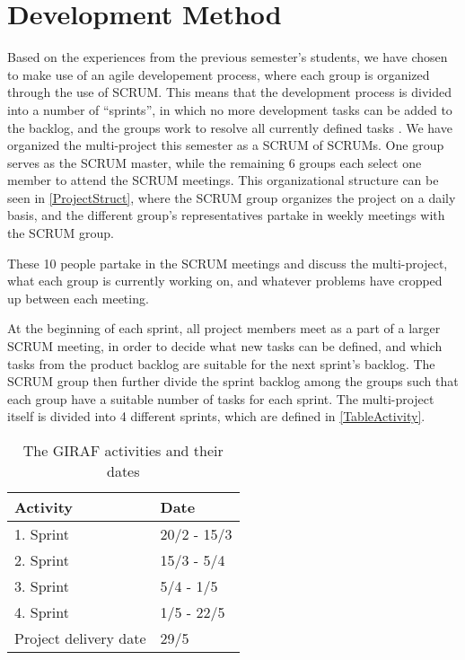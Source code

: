 \section{Development Method}
Based on the experiences from the previous semester's students, we have chosen
to make use of an agile developement process, where each group is organized through
the use of SCRUM. This means that the development process is divided into a
number of ``sprints'', in which no more development tasks can be added to the backlog, 
and the groups work to resolve all currently defined tasks \citep[Ch.7
p.109-111]{Larman2004}. We have organized the multi-project this semester as a SCRUM of SCRUMs. One group serves
as the SCRUM master, while the remaining 6 groups each select one member to
attend the SCRUM meetings. This organizational structure can be seen in
\autoref{ProjectStruct}, where the SCRUM group organizes the project on a daily
basis, and the different group's representatives partake in weekly meetings with
the SCRUM group.


These 10 people partake in the SCRUM meetings and discuss the
multi-project, what each group is currently working on, and whatever problems
have cropped up between each meeting.\nl

At the beginning of each sprint, all project members meet as a part of a larger
SCRUM meeting, in order to decide what new tasks can be defined, and which tasks
from the product backlog are suitable for the next sprint's backlog. The SCRUM
group then further divide the sprint backlog among the groups such that each
group have a suitable number of tasks for each sprint. The multi-project itself
is divided into 4 different sprints, which are defined in
\autoref{TableActivity}.

\begin{table}[H]
\centering
\begin{tabular}{|l|l|}
\hline
Activity & Date \\ \hline
1. Sprint & 20/2 - 15/3 \\\hline 
2. Sprint & 15/3 - 5/4\\\hline 
3. Sprint & 5/4 - 1/5\\\hline 
4. Sprint & 1/5 - 22/5\\\hline 
Project delivery date & 29/5\\\hline
\end{tabular}
\caption{The GIRAF activities and their dates}
\label{TableActivity}
\end{table}

